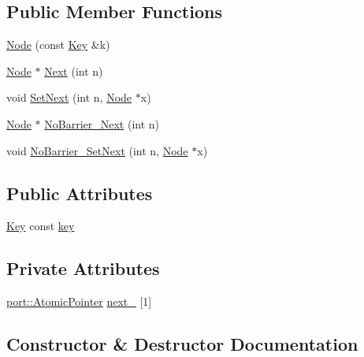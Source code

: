 \subsection*{Public Member Functions}
\begin{DoxyCompactItemize}
\item 
\hyperlink{structleveldb_1_1_skip_list_1_1_node_a7dec52445f4f05892239a77407d109b0}{Node} (const \hyperlink{namespaceleveldb_a7e9a9725b13fa0bd922d885280dfab95}{Key} \&k)
\item 
\hyperlink{structleveldb_1_1_skip_list_1_1_node}{Node} $\ast$ \hyperlink{structleveldb_1_1_skip_list_1_1_node_aca7f18fc57f6c8e8a8dfe176eedbde74}{Next} (int n)
\item 
void \hyperlink{structleveldb_1_1_skip_list_1_1_node_a46c7cc10db3d77c85df7e411b720a8f4}{Set\+Next} (int n, \hyperlink{structleveldb_1_1_skip_list_1_1_node}{Node} $\ast$x)
\item 
\hyperlink{structleveldb_1_1_skip_list_1_1_node}{Node} $\ast$ \hyperlink{structleveldb_1_1_skip_list_1_1_node_a96b7213d1fd9ef893f3a7baecc5c4801}{No\+Barrier\+\_\+\+Next} (int n)
\item 
void \hyperlink{structleveldb_1_1_skip_list_1_1_node_af93b362f5e38fcf645820e02377cca64}{No\+Barrier\+\_\+\+Set\+Next} (int n, \hyperlink{structleveldb_1_1_skip_list_1_1_node}{Node} $\ast$x)
\end{DoxyCompactItemize}
\subsection*{Public Attributes}
\begin{DoxyCompactItemize}
\item 
\hyperlink{namespaceleveldb_a7e9a9725b13fa0bd922d885280dfab95}{Key} const \hyperlink{structleveldb_1_1_skip_list_1_1_node_a654f196e057edd294e4dbcbb6dabb844}{key}
\end{DoxyCompactItemize}
\subsection*{Private Attributes}
\begin{DoxyCompactItemize}
\item 
\hyperlink{classleveldb_1_1port_1_1_atomic_pointer}{port\+::\+Atomic\+Pointer} \hyperlink{structleveldb_1_1_skip_list_1_1_node_ab05b7bdbc2bd10c867f02ee8fcb347e2}{next\+\_\+} \mbox{[}1\mbox{]}
\end{DoxyCompactItemize}


\subsection{Constructor \& Destructor Documentation}
\hypertarget{structleveldb_1_1_skip_list_1_1_node_a7dec52445f4f05892239a77407d109b0}{}
